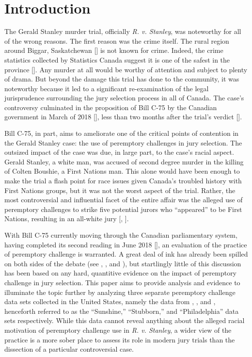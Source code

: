 \chapter{Introduction} \label{c:introduction}

The Gerald Stanley murder trial, officially \textit{R. v. Stanley}, was noteworthy for all of the wrong reasons. The first reason
was the crime itself. The rural region around Biggar, Saskatchewan
[\cite{StanleyWitnessAccounts}] is not known for crime. Indeed,
the crime statistics collected by Statistics Canada suggest it is one of the safest in the province
[\cite{SaskatchewanCrime}]. Any murder at all would be worthy of attention and subject to plenty of drama. But beyond the damage
this trial has done to the community, it was noteworthy because it led to a significant re-examination of the legal jurisprudence
surrounding the jury selection process in all of Canada. The case's controversy culminated in the proposition of
Bill C-75 by the Canadian government in March of 2018 [\cite{billc75}], less than two months after the trial's verdict
[\cite{GeraldStanleyVerdict}].

Bill C-75, in part, aims to ameliorate one of the critical points of contention in the Gerald Stanley case: the use of peremptory
challenges in jury selection. The outsized impact of the case was due, in large part, to the case's racial aspect. Gerald Stanley,
a white man, was accused of second degree murder in the killing of
Colten Boushie, a First Nations man. This alone would have been enough
to make the trial a flash point for race issues given Canada's troubled
history with First Nations groups, but it was
not the worst aspect of the trial. Rather, the most controversial and influential facet of the entire affair was the alleged use
of peremptory challenges to strike five potential jurors who ``appeared'' to be First Nations, resulting in an all-white jury
[\cite{fiverejected}, \cite{fraughthistory}].

With Bill C-75 currently moving through the Canadian parliamentary system, having completed its second reading in June
2018 [\cite{c75legisinfo}], an evaluation of the practice of peremptory challenge is warranted. A great deal of ink has
already been spilled on both sides of the debate (see \cite{peremparegood}, \cite{bothwrong}, and \cite{goodfirststep}), but startlingly
little of this discussion has been based on any hard, quantitive evidence on the impact of peremptory challenge in jury
selection. This paper aims to provide analysis and evidence to illuminate the topic further by analyzing three separate peremptory
challenge data sets collected in the United States, namely the data from \cite{JurySunshineProj}, \cite{StubbornLegacy}, and
\cite{PerempChalMurder}, henceforth referred to as the ``Sunshine,'' ``Stubborn,'' and ``Philadelphia'' data sets respectively. While this data cannot reveal anything about the alleged racial motivation of peremptory challenge use in
\textit{R. v. Stanley}, a wider view of the practice is a more sober
place to assess its role in modern jury trials than the dissection of a particular controversial case.

